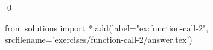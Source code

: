 \begin{ex}
  \label{ex:function-call-2}
  
  \mbox{}\\ \\
  \qed
\end{ex}
\begin{python0}
from solutions import *
add(label="ex:function-call-2",
    srcfilename='exercises/function-call-2/answer.tex') 
\end{python0}                              
